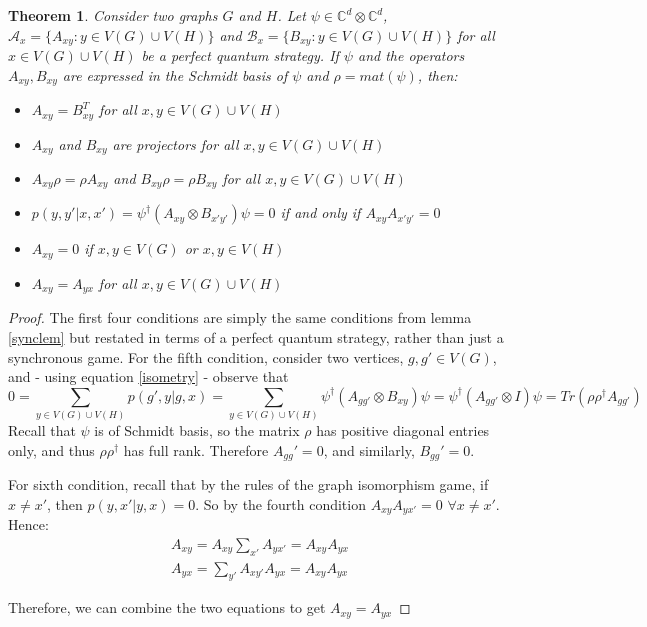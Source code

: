 \documentclass[12pt]{article}
\newtheorem{thm}{Theorem}[section]
\begin{document}
\begin{thm}
\label{syncthm}
Consider two graphs $G$ and $H$. Let $\psi \in \mathbb{C}^d \otimes \mathbb{C}^d$, $\mathcal{A}_x = \{A_{xy}: y \in V(G) \cup V(H)\}$ and $\mathcal{B}_x = \{B_{xy}: y \in V(G) \cup V(H)\}$ for all $x \in V(G) \cup V(H)$ be a perfect quantum strategy. If $\psi$ and the operators $A_{xy}, B_{xy}$ are expressed in the Schmidt basis of $\psi$ and $\rho = mat(\psi)$, then:
\begin{itemize}
\item $A_{xy} = B_{xy}^T$ for all $x, y \in V(G) \cup V(H)$
\item $A_{xy}$ and $B_{xy}$ are projectors for all $x, y \in V(G) \cup V(H)$
\item $A_{xy} \rho = \rho A_{xy}$ and $B_{xy} \rho = \rho B_{xy}$ for all $x, y \in V(G) \cup V(H)$
\item $p(y, y'|x, x') = \psi^{\dag} (A_{xy} \otimes B_{x'y'}) \psi = 0$ if and only if $A_{xy}A_{x'y'} = 0$
\item $A_{xy} = 0$ if $x, y \in V(G)$ or $x, y \in V(H)$
\item $A_{xy} = A_{yx}$ for all $x, y \in V(G) \cup V(H)$
\end{itemize}
\end{thm}
\begin{proof}
The first four conditions are simply the same conditions from lemma \ref{synclem} but restated in terms of a perfect quantum strategy, rather than just a synchronous game. For the fifth condition, consider two vertices, $g, g' \in V(G)$, and - using equation \ref{isometry} - observe that \begin{equation}
0 = \sum_{y \in V(G) \cup V(H)} p(g', y|g, x) = \sum_{y \in V(G) \cup V(H)} \psi^{\dag}(A_{gg'} \otimes B_{xy})\psi = \psi^{\dag}(A_{gg'} \otimes I)\psi = Tr(\rho \rho^{\dag} A_{gg'})
\end{equation}
Recall that $\psi$ is of Schmidt basis, so the matrix $\rho$ has positive diagonal entries only, and thus $\rho \rho^{\dag}$ has full rank. Therefore $A_{gg}' = 0$, and similarly, $B_{gg}' = 0$.

For sixth condition, recall that by the rules of the graph isomorphism game, if $x \neq x'$, then $p(y, x'|y, x) = 0$. So by the fourth condition $A_{xy}A_{yx'} = 0$ $\forall x \neq x'$. Hence: 
\begin{eqnarray}
A_{xy} = A_{xy} \sum_{x'} A_{yx'} = A_{xy}A_{yx} \\
A_{yx} = \sum_{y'} A_{xy'} A_{yx}= A_{xy}A_{yx}
\end{eqnarray}

Therefore, we can combine the two equations to get $A_{xy} = A_{yx}$
\end{proof}
\end{document}
